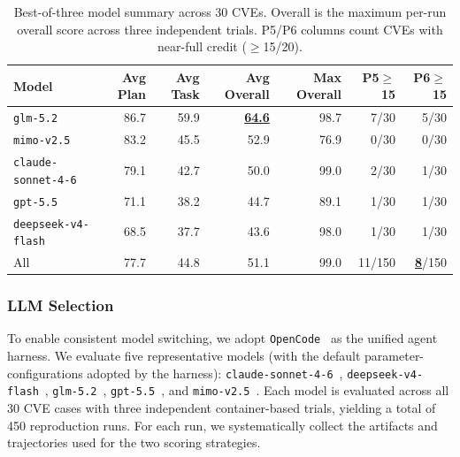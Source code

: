 \begin{table}[t]
\centering

\begin{tabular}{lrrrrrr}
\toprule
\textbf{Model} & \textbf{Avg Plan} & \textbf{Avg Task} & \textbf{Avg Overall} & \textbf{Max Overall} & \textbf{P5$\geq$15} & \textbf{P6$\geq$15} \\
\midrule
\texttt{glm-5.2} & 86.7 & 59.9 & \textbf{\underline{64.6}} & 98.7 & 7/30 & 5/30 \\
\texttt{mimo-v2.5} & 83.2 & 45.5 & 52.9 & 76.9 & 0/30 & 0/30 \\
\texttt{claude-sonnet-4-6} & 79.1 & 42.7 & 50.0 & 99.0 & 2/30 & 1/30 \\
\texttt{gpt-5.5} & 71.1 & 38.2 & 44.7 & 89.1 & 1/30 & 1/30 \\
\texttt{deepseek-v4-flash} & 68.5 & 37.7 & 43.6 & 98.0 & 1/30 & 1/30 \\
\midrule
All & 77.7 & 44.8 & 51.1 & 99.0 & 11/150 & \textbf{\underline{8}}/150 \\
\bottomrule
\end{tabular}
\caption{Best-of-three model summary across 30 CVEs. Overall is the maximum per-run overall score across three independent trials. P5/P6 columns count CVEs with near-full credit ($\geq$15/20).}
\label{tab:model-results}
\end{table}




\subsubsection{LLM Selection}
To enable consistent model switching, we adopt \texttt{OpenCode}~\cite{opencode_github} as the unified agent harness.
We evaluate five representative models (with the default parameter-configurations adopted by the harness): \texttt{claude-sonnet-4-6}~\cite{anthropic2026sonnet46}, \texttt{deepseek-v4-flash}~\cite{deepseekai2026deepseekv4}, \texttt{glm-5.2}~\cite{zeng2026glm5}, \texttt{gpt-5.5}~\cite{openai2026gpt55}, and \texttt{mimo-v2.5}~\cite{mimo2026v25pro}. Each model is evaluated across all 30 CVE cases with three independent container-based trials, yielding a total of 450 reproduction runs. For each run, we systematically collect the artifacts and trajectories used for the two scoring strategies.

